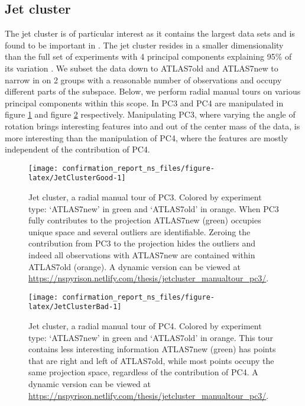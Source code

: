 \documentclass{monashthesis}
\begin{document}
\subsection{Jet cluster}\label{jet-cluster}

The jet cluster is of particular interest as it contains the largest
data sets and is found to be important in
\textcite{wang_visualizing_2018}. The jet cluster resides in a smaller
dimensionality than the full set of experiments with 4 principal
components explaining 95\% of its variation
\autocite{cook_dynamical_2018}. We subset the data down to ATLAS7old and
ATLAS7new to narrow in on 2 groups with a reasonable number of
observations and occupy different parts of the subspace. Below, we
perform radial manual tours on various principal components within this
scope. In PC3 and PC4 are manipulated in figure \ref{fig:JetClusterGood}
and figure \ref{fig:JetClusterBad} respectively. Manipulating PC3, where
varying the angle of rotation brings interesting features into and out
of the center mass of the data, is more interesting than the
manipulation of PC4, where the features are mostly independent of the
contribution of PC4.










\begin{figure}

{\centering \texttt{[image: confirmation\_report\_ns\_files/figure-latex/JetClusterGood-1]} 

}

\caption{Jet cluster, a radial manual tour of PC3.
Colored by experiment type: `ATLAS7new' in green and `ATLAS7old' in
orange. When PC3 fully contributes to the projection ATLAS7new (green)
occupies unique space and several outliers are identifiable. Zeroing the
contribution from PC3 to the projection hides the outliers and indeed
all observations with ATLAS7new are contained within ATLAS7old (orange).
A dynamic version can be viewed at
\url{https://nspyrison.netlify.com/thesis/jetcluster_manualtour_pc3/}.}\label{fig:JetClusterGood}
\end{figure}









\begin{figure}

{\centering \texttt{[image: confirmation\_report\_ns\_files/figure-latex/JetClusterBad-1]} 

}

\caption{Jet cluster, a radial manual tour of PC4.
Colored by experiment type: `ATLAS7new' in green and `ATLAS7old' in
orange. This tour contains less interesting information ATLAS7new
(green) has points that are right and left of ATLAS7old, while most
points occupy the same projection space, regardless of the contribution
of PC4. A dynamic version can be viewed at
\url{https://nspyrison.netlify.com/thesis/jetcluster_manualtour_pc3/}.}\label{fig:JetClusterBad}
\end{figure}
\end{document}
